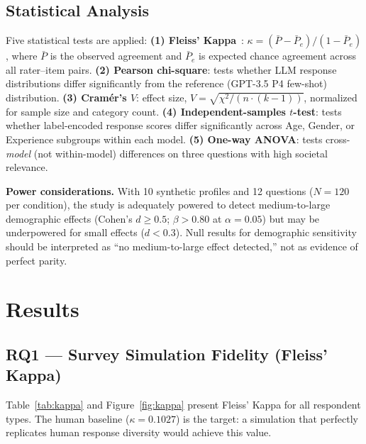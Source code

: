 \documentclass[sigconf,nonacm]{acmart}
\begin{document}
\subsection{Statistical Analysis}
\label{sec:method:stats}

Five statistical tests are applied:
\textbf{(1) Fleiss' Kappa}~\cite{fleiss1971}:
$\kappa = (\bar{P} - \bar{P}_e)/(1 - \bar{P}_e)$,
where $\bar{P}$ is the observed agreement and $\bar{P}_e$ is expected
chance agreement across all rater--item pairs.
\textbf{(2) Pearson chi-square}: tests whether LLM response distributions
differ significantly from the reference (GPT-3.5 P4 few-shot) distribution.
\textbf{(3) Cram\'{e}r's $V$}: effect size, $V = \sqrt{\chi^2/(n \cdot (k-1))}$,
normalized for sample size and category count.
\textbf{(4) Independent-samples $t$-test}: tests whether label-encoded
response scores differ significantly across Age, Gender, or Experience
subgroups within each model.
\textbf{(5) One-way ANOVA}: tests cross-\emph{model} (not within-model)
differences on three questions with high societal relevance.

\textbf{Power considerations.}
With 10 synthetic profiles and 12 questions ($N{=}120$ per condition),
the study is adequately powered to detect medium-to-large demographic effects
(Cohen's $d \geq 0.5$; $\beta > 0.80$ at $\alpha{=}0.05$) but may be
underpowered for small effects ($d < 0.3$).
Null results for demographic sensitivity should be interpreted as
``no medium-to-large effect detected,'' not as evidence of perfect parity.

\section{Results}
\label{sec:results}

\subsection{RQ1 --- Survey Simulation Fidelity (Fleiss' Kappa)}
\label{sec:results:kappa}

Table~\ref{tab:kappa} and Figure~\ref{fig:kappa} present Fleiss' Kappa
for all respondent types.
The human baseline ($\kappa{=}0.1027$) is the target: a simulation that
perfectly replicates human response diversity would achieve this value.
\end{document}
